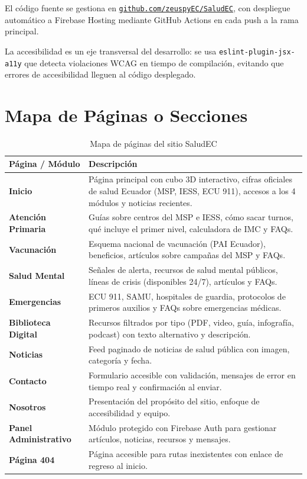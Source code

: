 \documentclass[12pt, a4paper]{article}
\begin{document}
El código fuente se gestiona en \href{https://github.com/zeuspyEC/SaludEC}{\texttt{github.com/zeuspyEC/SaludEC}}, con despliegue automático a Firebase Hosting mediante GitHub Actions en cada push a la rama principal.

La accesibilidad es un eje transversal del desarrollo: se usa \texttt{eslint-plugin-jsx-a11y} que detecta violaciones WCAG en tiempo de compilación, evitando que errores de accesibilidad lleguen al código desplegado.

\section{Mapa de Páginas o Secciones}

\begin{table}[H]
\centering
\caption{Mapa de páginas del sitio SaludEC}
\begin{tabular}{@{}>{\bfseries}p{3.5cm} p{10cm}@{}}
\toprule
\rowcolor{royalblue!12}
\textbf{Página / Módulo} & \textbf{Descripción} \\
\midrule
Inicio &
  Página principal con cubo 3D interactivo, cifras oficiales de salud Ecuador (MSP, IESS, ECU 911), accesos a los 4 módulos y noticias recientes. \\
Atención Primaria &
  Guías sobre centros del MSP e IESS, cómo sacar turnos, qué incluye el primer nivel, calculadora de IMC y FAQs. \\
Vacunación &
  Esquema nacional de vacunación (PAI Ecuador), beneficios, artículos sobre campañas del MSP y FAQs. \\
Salud Mental &
  Señales de alerta, recursos de salud mental públicos, líneas de crisis (disponibles 24/7), artículos y FAQs. \\
Emergencias &
  ECU 911, SAMU, hospitales de guardia, protocolos de primeros auxilios y FAQs sobre emergencias médicas. \\
Biblioteca Digital &
  Recursos filtrados por tipo (PDF, video, guía, infografía, podcast) con texto alternativo y descripción. \\
Noticias &
  Feed paginado de noticias de salud pública con imagen, categoría y fecha. \\
Contacto &
  Formulario accesible con validación, mensajes de error en tiempo real y confirmación al enviar. \\
Nosotros &
  Presentación del propósito del sitio, enfoque de accesibilidad y equipo. \\
Panel Administrativo &
  Módulo protegido con Firebase Auth para gestionar artículos, noticias, recursos y mensajes. \\
Página 404 &
  Página accesible para rutas inexistentes con enlace de regreso al inicio. \\
\bottomrule
\end{tabular}
\end{table}
\end{document}
